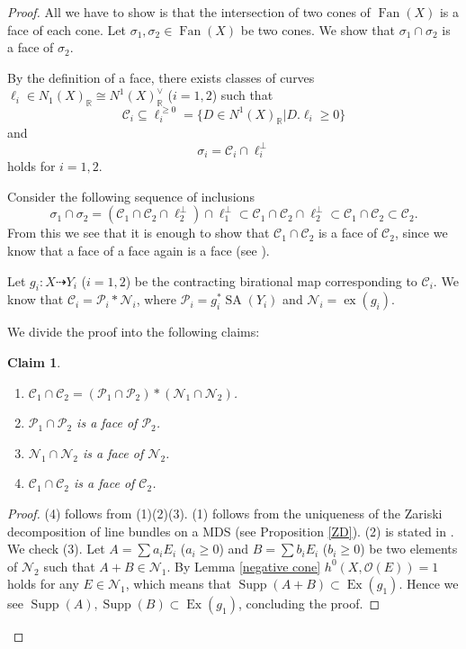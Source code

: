 \documentclass[12pt,twoside]{amsart}
\newtheorem*{claim}{Claim}
\theoremstyle{definition}
\newcommand\SA{\mathop{\mathrm{SA}}\nolimits}
\newcommand\Supp{\mathop{\mathrm{Supp}}\nolimits}
\newcommand\ex{\mathop{\mathrm{ex}}}
\newcommand\Ex{\mathop{\mathrm{Ex}}}
\newcommand\Fan{\mathop{\mathrm{Fan}}}
\newcommand\br{\mathbb{R}}
\begin{document}
\begin{proof}
All we have to show is that the intersection of two cones of $\Fan{(X)}$ is a face of each cone.
Let $\sigma_1,\sigma_2\in\Fan{(X)}$ be two cones. We show that $\sigma_1\cap\sigma_2$ is
a face of $\sigma_2$.

By the definition of a face, there exists classes of curves $\ell_i\in N_1(X)_{\br}
\cong N^{1}(X)_{\br}^{\vee}$ ($i=1,2$) such that
\begin{equation*}
\mathcal{C}_i\subseteq\ell_{i}^{\ge 0}=\{D\in N^{1}(X)_{\br}|D.\ell_i\ge 0\}
\end{equation*}
and
\begin{equation*}
\sigma_{i}=\mathcal{C}_i\cap\ell_{i}^{\perp}
\end{equation*}
holds for $i=1,2$.

Consider the following sequence of inclusions
\begin{equation*}
\sigma_1\cap\sigma_2=(\mathcal{C}_1\cap\mathcal{C}_2\cap\ell_2^{\perp})\cap\ell_1^{\perp}
\subset\mathcal{C}_1\cap\mathcal{C}_2\cap\ell_2^{\perp}\subset
\mathcal{C}_1\cap\mathcal{C}_2\subset\mathcal{C}_2.
\end{equation*}
From this we see that it is enough to show that $\mathcal{C}_1\cap\mathcal{C}_2$ is a face
of $\mathcal{C}_2$, since we know that a face of a face again is a face (see \cite[page 10(4)]{f2}).

Let $g_i:X\dasharrow Y_i$ ($i=1,2$) be the contracting birational map corresponding to $\mathcal{C}_i$.
We know that $\mathcal{C}_i=\mathcal{P}_i*\mathcal{N}_i$, where
$\mathcal{P}_i=g_i^{*}\SA{(Y_i)}$ and $\mathcal{N}_i=\ex{(g_i)}$.

We divide the proof into the following claims:
\begin{claim}
\begin{enumerate}
\item $\mathcal{C}_1\cap\mathcal{C}_2=(\mathcal{P}_1\cap\mathcal{P}_2)*
(\mathcal{N}_1\cap\mathcal{N}_2)$.
\item $\mathcal{P}_1\cap\mathcal{P}_2$ is a face of $\mathcal{P}_2$.
\item $\mathcal{N}_1\cap\mathcal{N}_2$ is a face of $\mathcal{N}_2$.
\item $\mathcal{C}_1\cap\mathcal{C}_2$ is a face of $\mathcal{C}_2$.
\end{enumerate}
\end{claim}
\begin{proof}
(4) follows from (1)(2)(3). (1) follows from the uniqueness of the Zariski decomposition of line bundles
on a MDS (see Proposition \ref{ZD}).
(2) is stated in \cite[Proposition 1.11(3)]{hk}. 
We check (3). Let $A=\sum a_iE_i$ ($a_i\ge 0$) and $B=\sum b_iE_i$ ($b_i\ge 0$) be
two elements of $\mathcal{N}_2$ such that $A+B\in\mathcal{N}_1$.
By Lemma \ref{negative cone} $h^{0}(X,\mathcal{O}(E))=1$ holds for any $E\in\mathcal{N}_1$, which means that
$\Supp{(A+B)}\subset \Ex{(g_1)}$. Hence we see $\Supp{(A)},\Supp{(B)}\subset \Ex{(g_1)}$,
concluding the proof.
\end{proof}
\end{proof}
\end{document}
